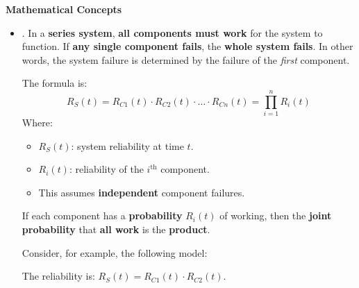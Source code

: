 \highspace
\begin{flushleft}
    \textcolor{Green3}{ \textbf{Mathematical Concepts}}
\end{flushleft}
\begin{itemize}
    \item {}. In a \textbf{series system}, \textbf{all components must work} for the system to function. If \textbf{any single component fails}, the \textbf{whole system fails}. In other words, the system failure is determined by the failure of the \emph{first} component.

    The formula is:
    \begin{equation}
        R_S(t) = R_{C1}(t) \cdot R_{C2}(t) \cdot \dots \cdot R_{Cn}(t) = \prod_{i=1}^{n} R_i(t)
    \end{equation}
    Where:
    \begin{itemize}
        \item $R_S(t)$: system reliability at time $t$.
        \item $R_i(t)$: reliability of the $i^\text{th}$ component.
        \item This assumes \textbf{independent} component failures.
    \end{itemize}
    If each component has a \textbf{probability} $R_i(t)$ of working, then the \textbf{joint probability} that \textbf{all work} is the \textbf{product}.

    \begin{examplebox}
        Consider, for example, the following model:
        \begin{center}
        \end{center}
        The reliability is: $R_{S}(t) = R_{C1}(t) \cdot R_{C2}(t)$.
    \end{examplebox}



\end{itemize}
